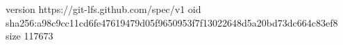 version https://git-lfs.github.com/spec/v1
oid sha256:a98c9cc11cd6fe47619479d05f9650953f7f13022648d5a20bd73dc664c83ef8
size 117673
